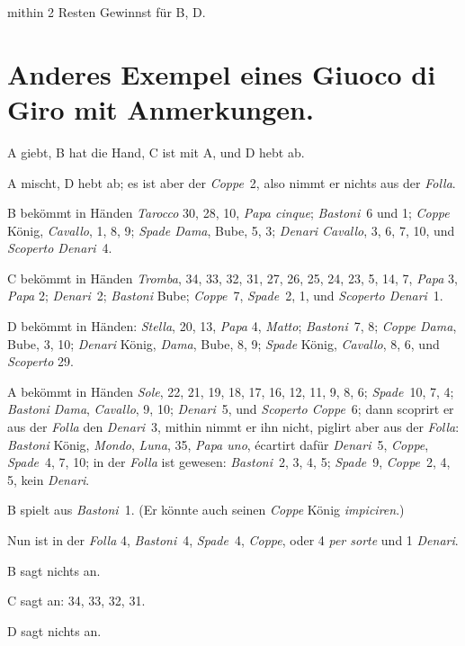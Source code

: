 \documentclass[11pt,a6paper,twoside]{article}
\begin{document}
mithin 2 Resten Gewinnst für B, D.

\section*{Anderes Exempel eines Giuoco di\\ Giro mit Anmerkungen.}

A giebt, B hat die Hand, C ist mit A, und D hebt ab.

A mischt, D hebt ab; es ist aber der \textit{Coppe}~2, also nimmt er nichts aus der \textit{Folla}.

B bekömmt in Händen \textit{Tarocco} 30, 28, 10, \textit{Papa cinque}; \textit{Bastoni}~6 und 1; \textit{Coppe} König, \textit{Cavallo}, 1, 8, 9; \textit{Spade Dama}, Bube, 5, 3; \textit{Denari Cavallo}, 3, 6, 7, 10, und \textit{Scoperto Denari}~4.

C bekömmt in Händen \textit{Tromba}, 34, 33, 32, 31, 27, 26, 25, 24, 23, 5, 14, 7, \textit{Papa} 3, \textit{Papa} 2; \textit{Denari}~2; \textit{Bastoni} Bube; \textit{Coppe}~7, \textit{Spade}~2, 1, und \textit{Scoperto Denari}~1.

D bekömmt in Händen: \textit{Stella}, 20, 13, \textit{Papa} 4, \textit{Matto}; \textit{Bastoni}~7, 8; \textit{Coppe Dama}, Bube, 3, 10; \textit{Denari} König, \textit{Dama}, Bube, 8, 9; \textit{Spade} König, \textit{Cavallo}, 8, 6, und \textit{Scoperto} 29.

A bekömmt in Händen \textit{Sole}, 22, 21, 19, 18, 17, 16, 12, 11, 9, 8, 6; \textit{Spade}~10, 7, 4; \textit{Bastoni Dama}, \textit{Cavallo}, 9, 10; \textit{Denari}~5, und \textit{Scoperto Coppe}~6; dann scoprirt er aus der \textit{Folla} den \textit{Denari}~3, mithin nimmt er ihn nicht, piglirt aber aus der \textit{Folla}: \textit{Bastoni} König, \textit{Mondo}, \textit{Luna}, 35, \textit{Papa uno}, écartirt dafür \textit{Denari}~5, \textit{Coppe}, \textit{Spade}~4, 7, 10; in der \textit{Folla} ist gewesen: \textit{Bastoni}~2, 3, 4, 5; \textit{Spade}~9, \textit{Coppe}~2, 4, 5, kein \textit{Denari}.

B spielt aus \textit{Bastoni}~1. (Er könnte auch seinen \textit{Coppe} König \textit{impiciren}.)

Nun ist in der \textit{Folla} 4, \textit{Bastoni}~4, \textit{Spade}~4, \textit{Coppe}, oder 4 \textit{per sorte} und 1 \textit{Denari}.

B sagt nichts an.

C sagt an: 34, 33, 32, 31.

D sagt nichts an.
\end{document}
